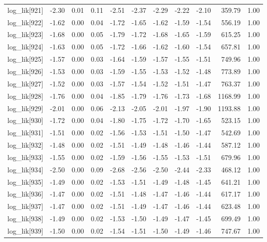 \begin{table}[ht]
\begin{tabular}{rrrrrrrrrrr}
  log\_lik[921] & -2.30 & 0.01 & 0.11 & -2.51 & -2.37 & -2.29 & -2.22 & -2.10 & 359.79 & 1.00 \\ 
  log\_lik[922] & -1.62 & 0.00 & 0.04 & -1.72 & -1.65 & -1.62 & -1.59 & -1.54 & 556.19 & 1.00 \\ 
  log\_lik[923] & -1.68 & 0.00 & 0.05 & -1.79 & -1.72 & -1.68 & -1.65 & -1.59 & 615.25 & 1.00 \\ 
  log\_lik[924] & -1.63 & 0.00 & 0.05 & -1.72 & -1.66 & -1.62 & -1.60 & -1.54 & 657.81 & 1.00 \\ 
  log\_lik[925] & -1.57 & 0.00 & 0.03 & -1.64 & -1.59 & -1.57 & -1.55 & -1.51 & 749.96 & 1.00 \\ 
  log\_lik[926] & -1.53 & 0.00 & 0.03 & -1.59 & -1.55 & -1.53 & -1.52 & -1.48 & 773.89 & 1.00 \\ 
  log\_lik[927] & -1.52 & 0.00 & 0.03 & -1.57 & -1.54 & -1.52 & -1.51 & -1.47 & 763.37 & 1.00 \\ 
  log\_lik[928] & -1.76 & 0.00 & 0.04 & -1.85 & -1.79 & -1.76 & -1.73 & -1.68 & 1168.99 & 1.00 \\ 
  log\_lik[929] & -2.01 & 0.00 & 0.06 & -2.13 & -2.05 & -2.01 & -1.97 & -1.90 & 1193.88 & 1.00 \\ 
  log\_lik[930] & -1.72 & 0.00 & 0.04 & -1.80 & -1.75 & -1.72 & -1.70 & -1.65 & 523.15 & 1.00 \\ 
  log\_lik[931] & -1.51 & 0.00 & 0.02 & -1.56 & -1.53 & -1.51 & -1.50 & -1.47 & 542.69 & 1.00 \\ 
  log\_lik[932] & -1.48 & 0.00 & 0.02 & -1.51 & -1.49 & -1.48 & -1.46 & -1.44 & 587.12 & 1.00 \\ 
  log\_lik[933] & -1.55 & 0.00 & 0.02 & -1.59 & -1.56 & -1.55 & -1.53 & -1.51 & 679.96 & 1.00 \\ 
  log\_lik[934] & -2.50 & 0.00 & 0.09 & -2.68 & -2.56 & -2.50 & -2.44 & -2.33 & 468.12 & 1.00 \\ 
  log\_lik[935] & -1.49 & 0.00 & 0.02 & -1.53 & -1.51 & -1.49 & -1.48 & -1.45 & 641.21 & 1.00 \\ 
  log\_lik[936] & -1.47 & 0.00 & 0.02 & -1.51 & -1.48 & -1.47 & -1.46 & -1.44 & 617.17 & 1.00 \\ 
  log\_lik[937] & -1.47 & 0.00 & 0.02 & -1.51 & -1.49 & -1.47 & -1.46 & -1.44 & 623.48 & 1.00 \\ 
  log\_lik[938] & -1.49 & 0.00 & 0.02 & -1.53 & -1.50 & -1.49 & -1.47 & -1.45 & 699.49 & 1.00 \\ 
  log\_lik[939] & -1.50 & 0.00 & 0.02 & -1.54 & -1.51 & -1.50 & -1.49 & -1.46 & 747.67 & 1.00 \\ 

\end{tabular}
\end{table}
